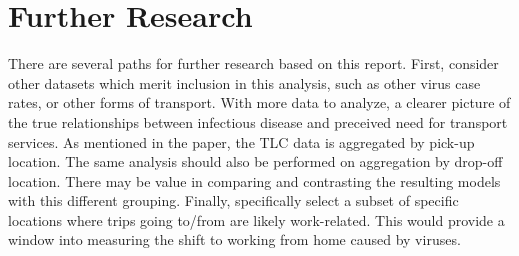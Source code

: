\documentclass[11pt]{article}
\begin{document}
\section{Further Research}
There are several paths for further research based on this report.
First, consider other datasets which merit inclusion
in this analysis, such as other virus case rates, or other forms of transport.
With more data to analyze, a clearer picture of the true relationships between infectious disease and preceived need for transport services.
As mentioned in the paper, the TLC data is aggregated by pick-up location.
    The same analysis should also be performed on aggregation by drop-off location.
    There may be value in comparing and contrasting the resulting models with this different grouping.
Finally, specifically select a subset of specific locations where trips going to/from are likely work-related. 
This would provide a window into measuring the shift to working from home caused by viruses.


\clearpage

\printbibliography
\end{document}
